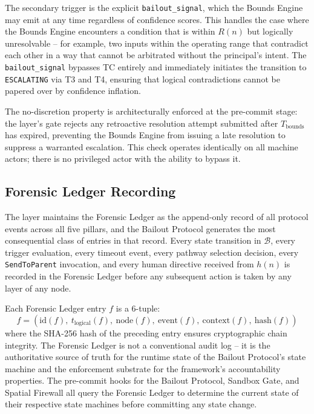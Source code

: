 The secondary trigger is the explicit \texttt{bailout\_signal}, which the Bounds
Engine may emit at any time regardless of confidence scores.  This handles the
case where the Bounds Engine encounters a condition that is within $R(n)$ but
logically unresolvable -- for example, two inputs within the operating range
that contradict each other in a way that cannot be arbitrated without the
principal's intent.  The \texttt{bailout\_signal} bypasses TC entirely and
immediately initiates the transition to \texttt{ESCALATING} via T3 and T4,
ensuring that logical contradictions cannot be papered over by confidence
inflation.

The no-discretion property is architecturally enforced at the pre-commit stage:
the \fact{} layer's gate rejects any retroactive resolution attempt submitted
after $T_{\text{bounds}}$ has expired, preventing the Bounds Engine from
issuing a late resolution to suppress a warranted escalation.  This check
operates identically on all machine actors; there is no privileged actor with
the ability to bypass it.

\subsection{Forensic Ledger Recording}\label{sec:bailout-forensic-ledger}

The \fact{} layer maintains the Forensic Ledger as the append-only record of
all protocol events across all five pillars, and the Bailout Protocol generates
the most consequential class of entries in that record.  Every state transition
in $\mathcal{B}$, every trigger evaluation, every timeout event, every pathway
selection decision, every \texttt{SendToParent} invocation, and every human
directive received from $h(n)$ is recorded in the Forensic Ledger before any
subsequent action is taken by any layer of any node.

Each Forensic Ledger entry $f$ is a 6-tuple:
\[
f = (\text{id}(f),\ t_{\text{logical}}(f),\ \text{node}(f),\ \text{event}(f),\ \text{context}(f),\ \text{hash}(f))
\]
where the SHA-256 hash of the preceding entry ensures cryptographic chain
integrity.  The Forensic Ledger is not a conventional audit log -- it is the
authoritative source of truth for the runtime state of the Bailout Protocol's
state machine and the enforcement substrate for the framework's
accountability properties.  The pre-commit hooks for the Bailout Protocol,
Sandbox Gate, and Spatial Firewall all query the Forensic Ledger to determine
the current state of their respective state machines before committing any
state change.

